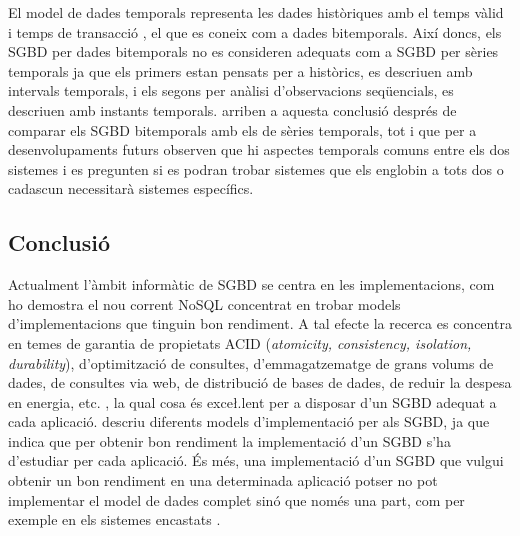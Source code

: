 El model de dades temporals representa les dades històriques amb el
temps vàlid i temps de
transacció \parencite[cap.~15]{date02:_tempor_data_relat_model}, el
que es coneix com a dades bitemporals.  Així doncs, els SGBD per dades
bitemporals no es consideren adequats com a SGBD per sèries temporals
ja que els primers estan pensats per a històrics, es descriuen amb
intervals temporals, i els segons per anàlisi d'observacions
seqüencials, es descriuen amb instants temporals.
\textcite{schmidt95} arriben a aquesta conclusió després de comparar
els SGBD bitemporals amb els de sèries temporals, tot i que per a
desenvolupaments futurs observen que hi aspectes temporals comuns
entre els dos sistemes i es pregunten si es podran trobar sistemes que
els englobin a tots dos o cadascun necessitarà sistemes específics.







\subsection{Conclusió}


Actualment l'àmbit informàtic de SGBD se centra en les
implementacions, com ho demostra el nou corrent NoSQL concentrat en
trobar models d'implementacions que tinguin bon rendiment. A tal
efecte la recerca es concentra en temes de garantia de propietats ACID
(\emph{atomicity, consistency, isolation, durability}), d'optimització
de consultes, d'emmagatzematge de grans volums de dades, de consultes
via web, de distribució de bases de dades, de reduir la despesa en
energia, etc. \parencite{stonebraker07,stonebraker10}, la qual cosa és
exce\l.lent per a disposar d'un SGBD adequat a cada aplicació.
\textcite{haerder05:_dbms_archit} descriu diferents models
d'implementació per als SGBD, ja que indica que per obtenir bon
rendiment la implementació d'un SGBD s'ha d'estudiar per cada
aplicació. És més, una implementació d'un SGBD que vulgui obtenir un
bon rendiment en una determinada aplicació potser no pot implementar
el model de dades complet sinó que només una part, com per exemple en
els sistemes
encastats \parencite{saake09:_downs_data_manag_embed_system}.

